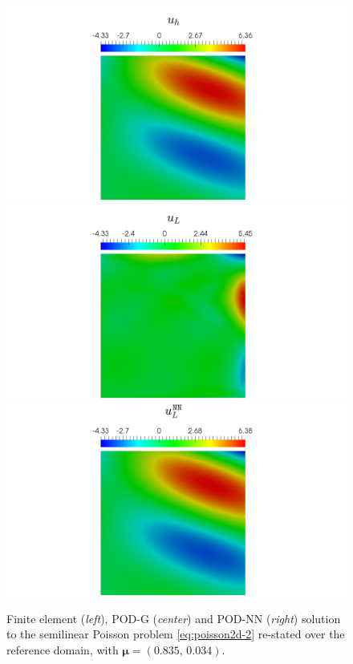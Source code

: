 \documentclass[12pt, a4paper, twoside, openright]{report}
\numberwithin{equation}{chapter}
\theoremstyle{theorem}
\theoremstyle{definition}
\theoremstyle{remark}
\theoremstyle{proposition}
\numberwithin{figure}{chapter}
\newcommand{\bg}[1]{\boldsymbol{#1}}
\begin{document}
		\begin{figure}[H]
			\center
			\includegraphics[scale = 0.29, trim = {8.5cm 0 9cm 0}, clip]{poisson2d_2_fem_solution}
			\includegraphics[scale = 0.29, trim = {8.5cm 0 9cm 0}, clip]{poisson2d_2_podg_solution}
			\includegraphics[scale = 0.29, trim = {8.5cm 0 9cm 0}, clip]{poisson2d_2_podnn_solution}
		
			\caption{Finite element (\emph{left}), POD-G (\emph{center}) and POD-NN (\emph{right}) solution to the semilinear Poisson problem \eqref{eq:poisson2d-2} re-stated over the reference domain, with $\bg{\mu} = (0.835, \, 0.034)$.}
			\label{fig:poisson2d-2-fig1}
		\end{figure}
		
\end{document}
